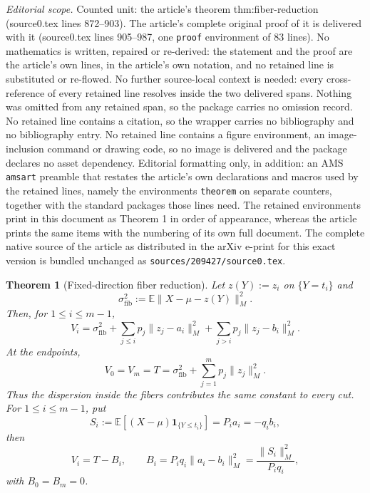 \documentclass[10pt,a4paper]{amsart}
\newtheorem{theorem}{Theorem}
\begin{document}
\noindent\textit{Editorial scope.} Counted unit: the article's theorem thm:fiber-reduction (source0.tex lines 872--903). The article's complete original proof of it is delivered with it (source0.tex lines 905--987, one \texttt{proof} environment of 83 lines). No mathematics is written, repaired or re-derived: the statement and the proof are the article's own lines, in the article's own notation, and no retained line is substituted or re-flowed.  No further source-local context is needed: every cross-reference of every retained line resolves inside the two delivered spans.  Nothing was omitted from any retained span, so the package carries no omission record.  No retained line contains a citation, so the wrapper carries no bibliography and no bibliography entry.  No retained line contains a figure environment, an image-inclusion command or drawing code, so no image is delivered and the package declares no asset dependency.  Editorial formatting only, in addition: an AMS \texttt{amsart} preamble that restates the article's own declarations and macros used by the retained lines, namely the environments \texttt{theorem} on separate counters, together with the standard packages those lines need.  The retained environments print in this document as Theorem 1 in order of appearance, whereas the article prints the same items with the numbering of its own full document.  The complete native source of the article as distributed in the arXiv e-print for this exact version is bundled unchanged as \texttt{sources/209427/source0.tex}.
\begin{theorem}[Fixed-direction fiber reduction]
\label{thm:fiber-reduction}
Let $z(Y):=z_i$ on $\{Y=t_i\}$ and
\[
  \sigma^2_{\mathrm{fib}}
  :=\mathbb E\|X-\mu-z(Y)\|_M^2.
\]
Then, for $1\leq i\leq m-1$,
\begin{equation}\label{eq:fiber-decomposition}
  V_i=\sigma^2_{\mathrm{fib}}
      +\sum_{j\leq i}p_j\|z_j-a_i\|_M^2
      +\sum_{j>i}p_j\|z_j-b_i\|_M^2.
\end{equation}
At the endpoints,
\[
 V_0=V_m=T=\sigma^2_{\mathrm{fib}}+\sum_{j=1}^m p_j\|z_j\|_M^2.
\]
Thus the dispersion inside the fibers contributes the same constant to every
cut.  For $1\leq i\leq m-1$, put
\[
  S_i:=\mathbb E[(X-\mu)\mathbf 1_{\{Y\leq t_i\}}]
      =P_i a_i=-q_i b_i,
\]
then
\begin{equation}\label{eq:vector-gain}
  V_i=T-B_i,
  \qquad
  B_i=P_iq_i\|a_i-b_i\|_M^2
     =\frac{\|S_i\|_M^2}{P_iq_i},
\end{equation}
with $B_0=B_m=0$.
\end{theorem}
\end{document}
